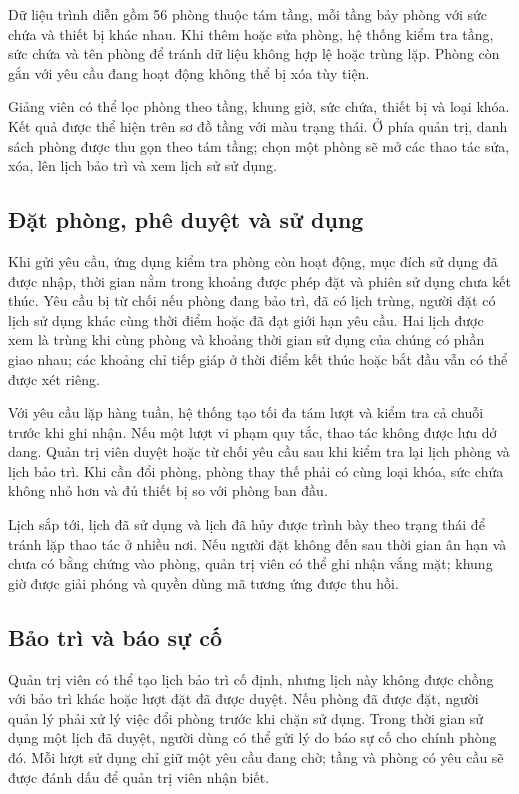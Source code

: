 Dữ liệu trình diễn gồm 56 phòng thuộc tám tầng, mỗi tầng bảy phòng với sức chứa và thiết bị khác nhau. Khi thêm hoặc sửa phòng, hệ thống kiểm tra tầng, sức chứa và tên phòng để tránh dữ liệu không hợp lệ hoặc trùng lặp. Phòng còn gắn với yêu cầu đang hoạt động không thể bị xóa tùy tiện.

Giảng viên có thể lọc phòng theo tầng, khung giờ, sức chứa, thiết bị và loại khóa. Kết quả được thể hiện trên sơ đồ tầng với màu trạng thái. Ở phía quản trị, danh sách phòng được thu gọn theo tám tầng; chọn một phòng sẽ mở các thao tác sửa, xóa, lên lịch bảo trì và xem lịch sử sử dụng.

\subsection{Đặt phòng, phê duyệt và sử dụng}

Khi gửi yêu cầu, ứng dụng kiểm tra phòng còn hoạt động, mục đích sử dụng đã được nhập, thời gian nằm trong khoảng được phép đặt và phiên sử dụng chưa kết thúc. Yêu cầu bị từ chối nếu phòng đang bảo trì, đã có lịch trùng, người đặt có lịch sử dụng khác cùng thời điểm hoặc đã đạt giới hạn yêu cầu. Hai lịch được xem là trùng khi cùng phòng và khoảng thời gian sử dụng của chúng có phần giao nhau; các khoảng chỉ tiếp giáp ở thời điểm kết thúc hoặc bắt đầu vẫn có thể được xét riêng.

Với yêu cầu lặp hàng tuần, hệ thống tạo tối đa tám lượt và kiểm tra cả chuỗi trước khi ghi nhận. Nếu một lượt vi phạm quy tắc, thao tác không được lưu dở dang. Quản trị viên duyệt hoặc từ chối yêu cầu sau khi kiểm tra lại lịch phòng và lịch bảo trì. Khi cần đổi phòng, phòng thay thế phải có cùng loại khóa, sức chứa không nhỏ hơn và đủ thiết bị so với phòng ban đầu.

Lịch sắp tới, lịch đã sử dụng và lịch đã hủy được trình bày theo trạng thái để tránh lặp thao tác ở nhiều nơi. Nếu người đặt không đến sau thời gian ân hạn và chưa có bằng chứng vào phòng, quản trị viên có thể ghi nhận vắng mặt; khung giờ được giải phóng và quyền dùng mã tương ứng được thu hồi.

\subsection{Bảo trì và báo sự cố}

Quản trị viên có thể tạo lịch bảo trì cố định, nhưng lịch này không được chồng với bảo trì khác hoặc lượt đặt đã được duyệt. Nếu phòng đã được đặt, người quản lý phải xử lý việc đổi phòng trước khi chặn sử dụng. Trong thời gian sử dụng một lịch đã duyệt, người dùng có thể gửi lý do báo sự cố cho chính phòng đó. Mỗi lượt sử dụng chỉ giữ một yêu cầu đang chờ; tầng và phòng có yêu cầu sẽ được đánh dấu để quản trị viên nhận biết.


